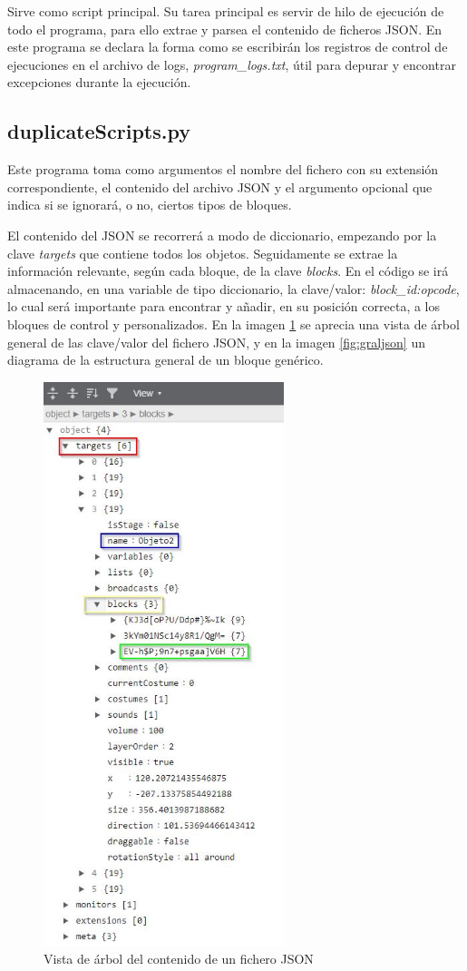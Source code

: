 \documentclass[a4paper, 12pt]{book}
\begin{document}
Sirve como script principal. Su tarea principal es servir de hilo de ejecución de todo el programa, para ello extrae y parsea el contenido de ficheros JSON. En este programa se declara la forma como se escribirán los registros de control de ejecuciones en el archivo de logs, \textit{program\_logs.txt}, útil para depurar y encontrar excepciones durante la ejecución.

\subsection{duplicateScripts.py}

Este programa toma como argumentos el nombre del fichero con su extensión correspondiente, el contenido del archivo JSON y el argumento opcional que indica si se ignorará, o no, ciertos tipos de bloques.

El contenido del JSON se recorrerá a modo de diccionario, empezando por la clave \textit{targets} que contiene todos los objetos. Seguidamente se extrae la información relevante, según cada bloque, de la clave \textit{blocks}. En el código se irá almacenando, en una variable de tipo diccionario, la clave/valor: \textit{block\_id:opcode}, lo cual será importante para encontrar y añadir, en su posición correcta, a los bloques de control y personalizados. En la imagen \ref{fig:arboljson} se aprecia una vista de árbol general de las clave/valor del fichero JSON, y en la imagen \ref{fig:graljson} un diagrama de la estructura general de un bloque genérico.

\begin{figure}[!htb]
  \centering
  \includegraphics[width=7cm, keepaspectratio]{img/jsontree.jpg}
  \caption{Vista de árbol del contenido de un fichero JSON}
  \label{fig:arboljson}
\end{figure}
\end{document}
